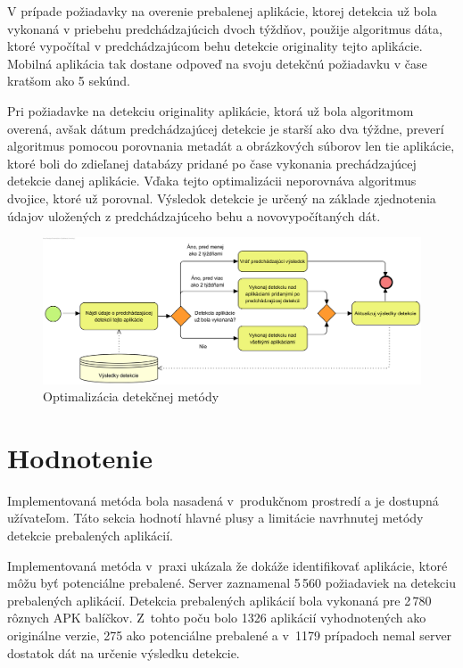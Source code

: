 V prípade požiadavky na overenie prebalenej aplikácie, ktorej detekcia už bola vykonaná v priebehu predchádzajúcich dvoch týždňov, použije algoritmus dáta, ktoré vypočítal v predchádzajúcom behu detekcie originality tejto aplikácie. Mobilná aplikácia tak dostane odpoveď na svoju detekčnú požiadavku v čase kratšom ako 5 sekúnd.

Pri požiadavke na detekciu originality aplikácie, ktorá už bola algoritmom overená, avšak dátum predchádzajúcej detekcie je starší ako dva týždne, preverí algoritmus pomocou porovnania metadát a obrázkových súborov len tie aplikácie, ktoré boli do zdieľanej databázy pridané po čase vykonania prechádzajúcej detekcie danej aplikácie. Vďaka tejto optimalizácii neporovnáva algoritmus dvojice, ktoré už porovnal. Výsledok detekcie je určený na základe zjednotenia údajov  uložených z predchádzajúceho behu a novovypočítaných dát. 

\begin{figure}[H]
  \begin{center}
    \includegraphics[width=130mm]{images/detection-optimalization.png}
  \end{center}
  \caption{Optimalizácia detekčnej metódy}
  \label{fig:detectionOriginal}
\end{figure}

\section{Hodnotenie}
\label{sec:hodnotenie}
Implementovaná metóda bola nasadená v~produkčnom prostredí a je dostupná užívateľom. Táto sekcia hodnotí hlavné plusy a limitácie navrhnutej metódy detekcie prebalených aplikácií.

Implementovaná metóda v~praxi ukázala že dokáže identifikovať aplikácie, ktoré môžu byť potenciálne prebalené. Server zaznamenal 5\,560 požiadaviek na detekciu prebalených aplikácií. Detekcia prebalených aplikácií bola vykonaná pre 2\,780 rôznych APK balíčkov.  Z~tohto poču bolo 1326 aplikácií vyhodnotených ako originálne verzie, 275 ako potenciálne prebalené a v~1179 prípadoch nemal server dostatok dát na určenie výsledku detekcie.


